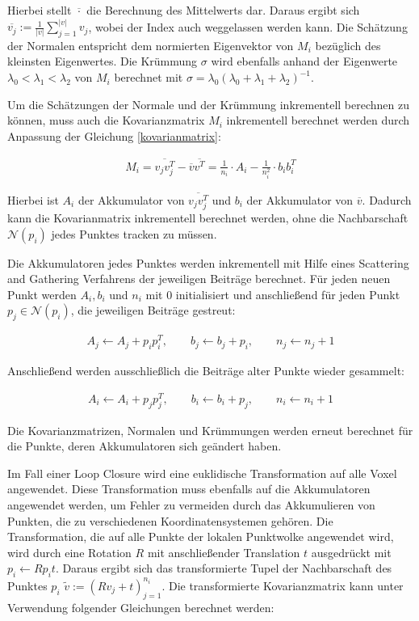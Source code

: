 Hierbei stellt $ \overline{\cdot} $ die Berechnung des Mittelwerts dar. Daraus ergibt sich $ \overline{v_j} := \frac{1}{\vert v \vert} \sum_{j=1}^{\vert v \vert} v_j $, wobei der Index auch weggelassen werden kann. Die Schätzung der Normalen entspricht dem normierten Eigenvektor von $ M_i $   bezüglich des kleinsten Eigenwertes. Die Krümmung $ \sigma $ wird ebenfalls anhand der Eigenwerte $ \lambda_0 < \lambda_1 < \lambda_2 $ von $ M_i $ berechnet mit $ \sigma = \lambda_0(\lambda_0+\lambda_1+\lambda_2)^{-1} $. 

Um die Schätzungen der Normale und der Krümmung inkrementell berechnen zu können, muss auch die Kovarianzmatrix $ M_i $ inkrementell berechnet werden durch Anpassung der Gleichung \ref{kovarianmatrix}:

\begin{align}
	M_i = \overline{v_jv_j^T}-\overline{v}\overline{v^T} = \frac{1}{n_i}\cdot A_i-\frac{1}{n_i^2}\cdot b_ib_i^T
\end{align} 
 
Hierbei ist $ A_i $ der Akkumulator von $ \overline{v_jv_j^T} $ und $ b_i $ der Akkumulator von $ \overline{v} $. Dadurch kann die Kovarianmatrix inkrementell berechnet werden, ohne die Nachbarschaft  $ \mathcal{N}(p_i) $ jedes Punktes tracken zu müssen. 

Die Akkumulatoren jedes Punktes werden inkrementell mit Hilfe eines Scattering and Gathering Verfahrens der jeweiligen Beiträge berechnet. Für jeden neuen Punkt werden $ A_i, b_i $ und $ n_i $ mit 0 initialisiert und anschließend für jeden Punkt $ p_j \in \mathcal{N}(p_i) $, die jeweiligen Beiträge gestreut: 

\begin{align}
	A_j \leftarrow  A_j + p_ip_i^T, \qquad b_j \leftarrow b_j + p_i, \qquad n_j \leftarrow n_j + 1
\end{align}

Anschließend werden ausschließlich die Beiträge alter Punkte wieder gesammelt: 

\begin{align}
	A_i \leftarrow A_i + p_jp_j^T, \qquad b_i \leftarrow b_i + p_j, \qquad n_i \leftarrow n_i + 1
\end{align}

Die  Kovarianzmatrizen, Normalen und Krümmungen werden erneut berechnet für die Punkte, deren Akkumulatoren sich geändert haben.

Im Fall einer Loop Closure wird eine euklidische Transformation auf alle Voxel angewendet. Diese Transformation muss ebenfalls auf die Akkumulatoren angewendet werden, um Fehler zu vermeiden durch das Akkumulieren von Punkten, die zu verschiedenen Koordinatensystemen gehören. Die Transformation, die auf alle Punkte der lokalen Punktwolke angewendet wird, wird durch eine Rotation $ R $ mit anschließender Translation $ t $ ausgedrückt mit $ p_i \leftarrow Rp_i  t $. Daraus ergibt sich das transformierte Tupel der Nachbarschaft des Punktes $ p_i $ $ \widetilde{v} := (Rv_j + t)_{j=1}^{n_i} $. Die transformierte Kovarianzmatrix kann unter Verwendung folgender Gleichungen berechnet werden: 

